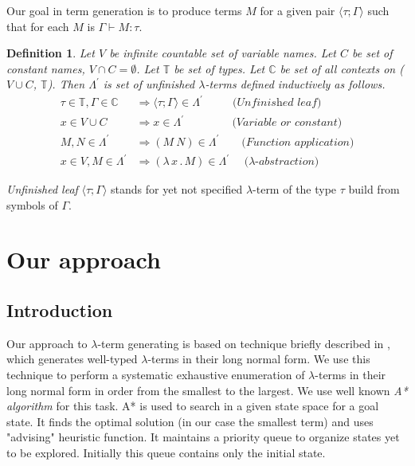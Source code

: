 \documentclass[conference]{IEEEtran}
\newtheorem{definition}{Definition}
\newcommand{\lterm}{$\lambda$-term\xspace}
\newcommand{\lterms}{$\lambda$-terms\xspace}
\newcommand{\tur}[3]{#1\vdash{}#2 \colon #3}
\newcommand{\then}{\Rightarrow\xspace}
\newcommand{\lamb}[2]{( \lambda \, #1 \, . \, #2 )}
\newcommand{\T}{\mathbb{T}\xspace}
\newcommand{\C}{\mathbb{C}\xspace}
\newcommand{\Lpr}{\Lambda^\prime}
\newcommand{\ul}[2]{\langle #1 ; #2 \rangle}
\newcommand{\red}[1]{{\color{red} #1}}
\begin{document}
Our goal in term generation is to produce terms $M$
for a given pair $\ul{\tau}{\Gamma}$
such that for each $M$ is $\tur{\Gamma}{M}{\tau}$.

\begin{definition}
Let $V$ be infinite countable set of {\it 
variable names}. Let $C$ be set of {\it constant names}, 
$V \cap C = \emptyset$.	
Let $\T$ be set of types.
Let $\C$ be set of all contexts on ($V \cup C$, $\T$).
Then $\Lpr$ is set of 
\textit{unfinished  \lterms} defined inductively as follows.	
\begin{align*}
\tau \in \T , \Gamma \in \C &\then \ul{\tau}{\Gamma} \in \Lpr
\textit{~~~~~~~~(Unfinished leaf)}\\
x   \in V \cup C  &\then x     \in \Lpr
\textit{~~~~~~~~~~~~~(Variable or constant)}\\
M,N \in \Lpr   &\then (M~N) \in \Lpr 
\textit{~~~~~~(Function application)} \\
x   \in V , M \in \Lpr &\then \lamb{x}{M} \in \Lpr
\textit{~~~~($\lambda$-abstraction)} 
\end{align*}
\end{definition}


\textit{Unfinished leaf} $\ul{\tau}{\Gamma}$ 
stands for yet not specified \lterm of the type $\tau$ 
build from symbols of $\Gamma$.



\section{Our approach}
\label{approach}

\subsection{Introduction}


Our approach to \lterm generating is based on technique 
briefly described in \cite{barendregt10}, which generates
well-typed \lterms in their long normal form. 
We use this technique to perform a systematic exhaustive enumeration
of \lterms in their long normal form in order from the smallest to the largest.
We use well known \textit{A* algorithm} \cite{AIMA} for this task.
A* is used to search in a given state space for a goal state. 
It finds the optimal solution (in our case the smallest term)
and uses "advising" heuristic function.
It maintains a priority queue to organize states yet to be explored.
Initially this queue contains only the initial state.  
\end{document}
